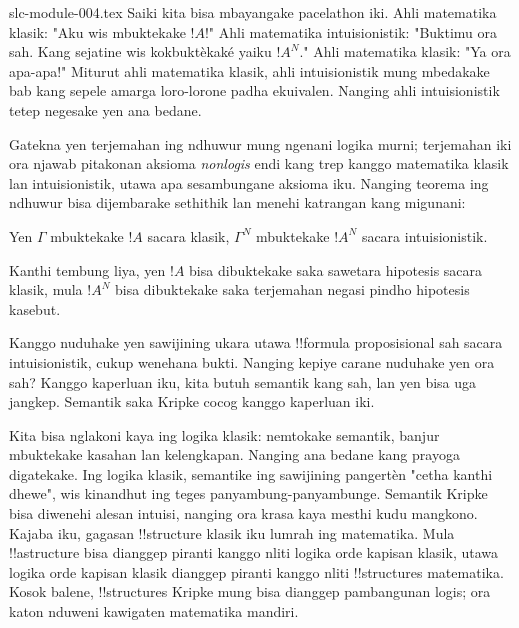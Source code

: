 \begin{filecontents*}[overwrite]{slc-module-004.tex}
Saiki kita bisa mbayangake
pacelathon iki. Ahli matematika
klasik: "Aku wis mbuktekake
$!A$!" Ahli matematika
intuisionistik: "Buktimu
ora sah. Kang sejatine
wis kokbuktèkaké yaiku
$!A^N$." Ahli matematika
klasik: "Ya ora apa-apa!"
Miturut ahli matematika
klasik, ahli intuisionistik
mung mbedakake bab kang
sepele amarga loro-lorone
padha ekuivalen. Nanging
ahli intuisionistik
tetep negesake yen ana
bedane.

Gatekna yen terjemahan
ing ndhuwur mung ngenani
logika murni; terjemahan
iki ora njawab pitakonan
aksioma \emph{nonlogis}
endi kang trep kanggo
matematika klasik lan
intuisionistik, utawa
apa sesambungane aksioma
iku. Nanging teorema
ing ndhuwur bisa
dijembarake sethithik
lan menehi katrangan
kang migunani:

\begin{thm}
Yen $\Gamma$ mbuktekake $!A$ sacara klasik,
$\Gamma^N$ mbuktekake $!A^N$
sacara intuisionistik.
\end{thm}

Kanthi tembung liya,
yen $!A$ bisa dibuktekake
saka sawetara hipotesis
sacara klasik, mula
$!A^N$ bisa dibuktekake
saka terjemahan negasi
pindho hipotesis kasebut.

Kanggo nuduhake yen sawijining
ukara utawa !!{formula}
proposisional sah sacara
intuisionistik, cukup
wenehana bukti. Nanging
kepiye carane nuduhake
yen ora sah? Kanggo
kaperluan iku, kita butuh
semantik kang sah, lan
yen bisa uga jangkep.
Semantik saka Kripke
cocog kanggo kaperluan iki.

Kita bisa nglakoni kaya
ing logika klasik:
nemtokake semantik, banjur
mbuktekake kasahan lan
kelengkapan. Nanging ana
bedane kang prayoga
digatekake. Ing logika
klasik, semantike ing
sawijining pangertèn
"cetha kanthi dhewe",
wis kinandhut ing teges
panyambung-panyambunge.
Semantik Kripke bisa
diwenehi alesan intuisi,
nanging ora krasa kaya
mesthi kudu mangkono.
Kajaba iku, gagasan
!!{structure} klasik
iku lumrah ing matematika.
Mula !!a{structure}
bisa dianggep piranti
kanggo nliti logika
orde kapisan klasik,
utawa logika orde
kapisan klasik dianggep
piranti kanggo nliti
!!{structure}s matematika.
Kosok balene,
!!{structure}s Kripke
mung bisa dianggep
pambangunan logis;
ora katon nduweni
kawigaten matematika
mandiri.


\end{filecontents*}
